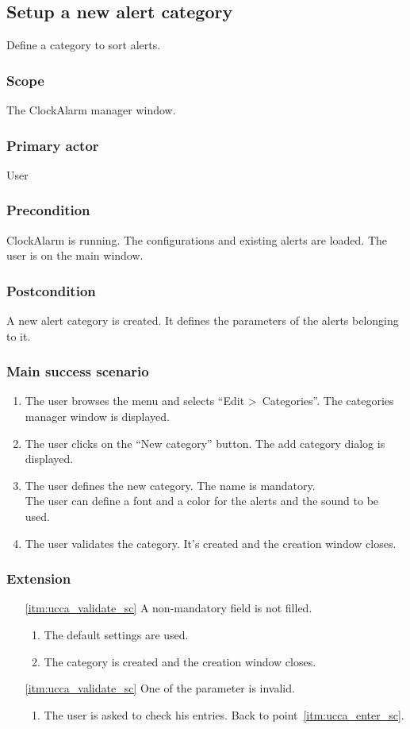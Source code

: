 \subsection{Setup a new alert category}
Define a category to sort alerts.
\subsubsection{Scope}
The ClockAlarm manager window.
\subsubsection{Primary actor}
User
\subsubsection{Precondition}
ClockAlarm is running. The configurations and existing alerts are loaded. The user is on the main window.
\subsubsection{Postcondition}
A new alert category is created. It defines the parameters of the alerts belonging to it.
\subsubsection{Main success scenario}
\begin{enumerate}
	\item The user browses the menu and selects ``Edit \textgreater~Categories''. The categories manager window is displayed.
	\item The user clicks on the ``New category'' button. The add category dialog is displayed.
	\item\label{itm:ucca_enter_sc}The user defines the new category. The name is mandatory. \\The user can define a font and a color for the alerts and the sound to be used.
	\item\label{itm:ucca_validate_sc} The user validates the category. It's created and the creation window closes.
\end{enumerate}
\subsubsection{Extension}
\begin{enumerate}
	\item[\ref{itm:ucca_validate_sc}] A non-mandatory field is not filled.
	\begin{enumerate}[i]
		\item The default settings are used. 
		\item The category is created and the creation window closes.
	\end{enumerate}
	
	\item[\ref{itm:ucca_validate_sc}] One of the parameter is invalid.
	\begin{enumerate}[i]
		\item The user is asked to check his entries. Back to point~\ref{itm:ucca_enter_sc}.
	\end{enumerate}
\end{enumerate}
